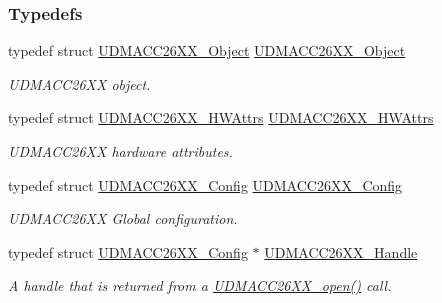 \subsubsection*{Typedefs}
\begin{DoxyCompactItemize}
\item 
typedef struct \hyperlink{struct_u_d_m_a_c_c26_x_x___object}{U\-D\-M\-A\-C\-C26\-X\-X\-\_\-\-Object} \hyperlink{_u_d_m_a_c_c26_x_x_8h_a3645577cacce45f1ad3b4879e3ef5afc}{U\-D\-M\-A\-C\-C26\-X\-X\-\_\-\-Object}
\begin{DoxyCompactList}\small\item\em U\-D\-M\-A\-C\-C26\-X\-X object. \end{DoxyCompactList}\item 
typedef struct \hyperlink{struct_u_d_m_a_c_c26_x_x___h_w_attrs}{U\-D\-M\-A\-C\-C26\-X\-X\-\_\-\-H\-W\-Attrs} \hyperlink{_u_d_m_a_c_c26_x_x_8h_ac9e26a57f30a829b5b2e3174e1df812f}{U\-D\-M\-A\-C\-C26\-X\-X\-\_\-\-H\-W\-Attrs}
\begin{DoxyCompactList}\small\item\em U\-D\-M\-A\-C\-C26\-X\-X hardware attributes. \end{DoxyCompactList}\item 
typedef struct \hyperlink{struct_u_d_m_a_c_c26_x_x___config}{U\-D\-M\-A\-C\-C26\-X\-X\-\_\-\-Config} \hyperlink{_u_d_m_a_c_c26_x_x_8h_a59acc64eb8db50a7a37b44fb4fa5fad1}{U\-D\-M\-A\-C\-C26\-X\-X\-\_\-\-Config}
\begin{DoxyCompactList}\small\item\em U\-D\-M\-A\-C\-C26\-X\-X Global configuration. \end{DoxyCompactList}\item 
typedef struct \hyperlink{struct_u_d_m_a_c_c26_x_x___config}{U\-D\-M\-A\-C\-C26\-X\-X\-\_\-\-Config} $\ast$ \hyperlink{_u_d_m_a_c_c26_x_x_8h_a969a9feb0f822c4764ef1da2ff5066cf}{U\-D\-M\-A\-C\-C26\-X\-X\-\_\-\-Handle}
\begin{DoxyCompactList}\small\item\em A handle that is returned from a \hyperlink{_u_d_m_a_c_c26_x_x_8h_aa7a244c7cfec8551f11ad5d4b5afa0ff}{U\-D\-M\-A\-C\-C26\-X\-X\-\_\-open()} call. \end{DoxyCompactList}\end{DoxyCompactItemize}
